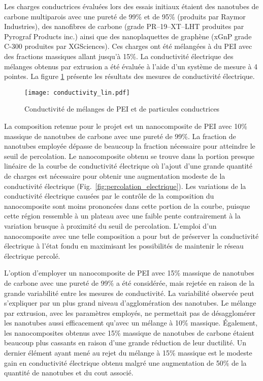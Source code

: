 Les charges conductrices évaluées lors des essais initiaux étaient des nanotubes de carbone multiparois avec une pureté de 99\% et de 95\% (produits par Raymor Industries), des nanofibres de carbone (grade PR--19--XT--LHT produites par Pyrograf Products inc.) ainsi que des nanoplaquettes de graphène (xGnP grade C-300 produites par XGSciences). 
Ces charges ont été mélangées à du PEI avec des fractions massiques allant jusqu'à 15\%.
La conductivité électrique des mélanges obtenus par extrusion a été évaluée à l'aide d'un système de mesure à 4 pointes. 
La figure \ref{fig:conductivite_lin} présente les résultats des mesures de conductivité électrique. 

\begin{figure}[h]
	\centering
	\texttt{[image: conductivity\_lin.pdf]}
	\caption{Conductivité de mélanges de PEI et de particules conductrices}
	\label{fig:conductivite_lin}
\end{figure}

La composition retenue pour le projet est un nanocomposite de PEI avec 10\% massique de nanotubes de carbone avec une pureté de 99\%. 
La fraction de nanotubes employée dépasse de beaucoup la fraction nécessaire pour atteindre le seuil de percolation.
Le nanocomposite obtenu se trouve dans la portion presque linéaire de la courbe de conductivité électrique où l'ajout d'une grande quantité de charges est nécessaire pour obtenir une augmentation modeste de la conductivité électrique (Fig.~\ref{fig:percolation_electrique}). 
Les variations de la conductivité électrique causées par le contrôle de la composition du nanocomposite sont moins prononcées dans cette portion de la courbe, puisque cette région ressemble à un plateau avec une faible pente contrairement à la variation brusque à proximité du seuil de percolation. 
L'emploi d'un nanocomposite avec une telle composition a pour but de préserver la conductivité électrique à l'état fondu en maximisant les possibilités de maintenir le réseau électrique percolé. 

L'option d'employer un nanocomposite de PEI avec 15\% massique de nanotubes de carbone avec une pureté de 99\% a été considérée, mais rejetée en raison de la grande variabilité entre les mesures de conductivité. 
La variabilité observée peut s'expliquer par un plus grand niveau d'agglomération des nanotubes.  
Le mélange par extrusion, avec les paramètres employés, ne permettait pas de désagglomérer les nanotubes aussi efficacement qu'avec un mélange à 10\% massique. 
Également, les nanocomposites obtenus avec 15\% massique de nanotubes de carbone étaient beaucoup plus cassants en raison d'une grande réduction de leur ductilité. 
Un dernier élément ayant mené au rejet du mélange à 15\% massique est le modeste gain en conductivité électrique obtenu malgré une augmentation de 50\% de la quantité de nanotubes et du cout associé. 

